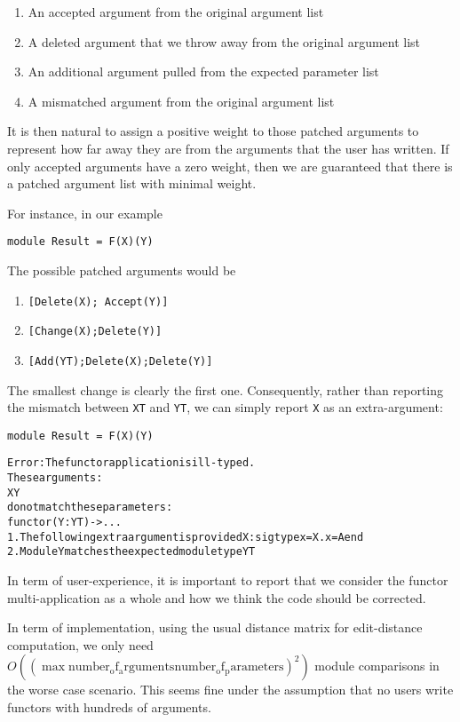 \documentclass{article}
\begin{document}
\begin{enumerate}
\item An accepted argument from the original argument list
\item A deleted argument that we throw away from the original argument list
\item An additional argument pulled from the expected parameter list
\item A mismatched argument from the original argument list
\end{enumerate}

It is then natural to assign a positive weight to those patched arguments to represent how far away they
are from the arguments that the user has written.
If only accepted arguments have a zero weight, then we are guaranteed that there is a patched argument list
with minimal weight.

For instance, in our example

\begin{verbatim}
module Result = F(X)(Y)
\end{verbatim}

The possible patched arguments would be

\begin{enumerate}
\item \texttt{[Delete(X); Accept(Y)]}
\item \texttt{[Change(X);Delete(Y)]}
\item \texttt{[Add(YT);Delete(X);Delete(Y)]}
\end{enumerate}

The smallest change is clearly the first one. Consequently, rather than reporting
the mismatch between \texttt{XT} and \texttt{YT}, we can simply report \texttt{X}
as an extra-argument:
\begin{verbatim}
module Result = F(X)(Y)
\end{verbatim}
\begin{alltt}
Error: The functor application is ill-typed.
       These arguments:
         X Y
       do not match these parameters:
         functor  (Y : YT) -> ...
  1. The following extra argument is provided X : sig type x = X.x = A end
  2. Module Y matches the expected module type YT
\end{alltt}

In term of user-experience, it is important to report that we consider the
functor multi-application as a whole and how we think the code should be corrected.

In term of implementation, using the usual distance matrix for edit-distance computation, we only need
$O((\max \mathrm{number_of_arguments} \mathrm{number_of_parameters} )^2)$ module comparisons in the worse case
scenario.
This seems fine under the assumption that no users write functors with hundreds of arguments.
\end{document}
